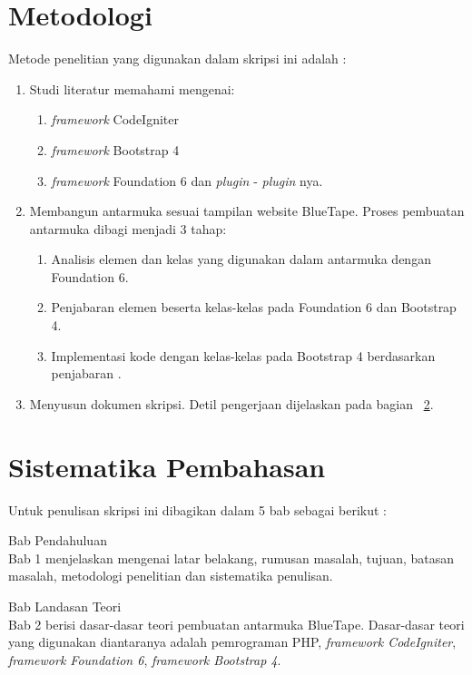 \section{Metodologi}
\label{sec:metlit}
Metode penelitian yang digunakan dalam skripsi ini adalah :
\begin{enumerate}
	\item Studi literatur memahami mengenai:
	\begin{enumerate}
		\item \textit{framework} CodeIgniter
		\item \textit{framework} Bootstrap 4
		\item \textit{framework} Foundation 6 dan \textit{plugin} - \textit{plugin} nya.
	\end{enumerate}
	\item  Membangun antarmuka sesuai tampilan website BlueTape. Proses pembuatan antarmuka dibagi menjadi 3 tahap:
	\begin{enumerate}
		\item Analisis elemen dan kelas yang digunakan dalam antarmuka dengan Foundation 6.
		\item Penjabaran elemen beserta kelas-kelas pada Foundation 6 dan Bootstrap 4.
		\item Implementasi kode dengan kelas-kelas pada Bootstrap 4 berdasarkan penjabaran .
	\end{enumerate}
	\item Menyusun dokumen skripsi. Detil pengerjaan dijelaskan pada bagian ~\ref{sec:sispem}.
\end{enumerate}


\section{Sistematika Pembahasan}
\label{sec:sispem}
Untuk penulisan skripsi ini dibagikan dalam 5 bab sebagai berikut :
\doublespacing
\begin{singlespace}
\noindent Bab Pendahuluan \\
Bab 1 menjelaskan mengenai latar belakang, rumusan masalah, tujuan, batasan masalah, metodologi penelitian dan sistematika penulisan.
\end{singlespace}

\begin{singlespace}
\noindent Bab Landasan Teori \\
Bab 2 berisi dasar-dasar teori pembuatan antarmuka BlueTape. Dasar-dasar teori yang digunakan diantaranya adalah pemrograman PHP, \textit{framework CodeIgniter}, \textit{framework Foundation 6}, \textit{framework Bootstrap 4}.
\end{singlespace}

